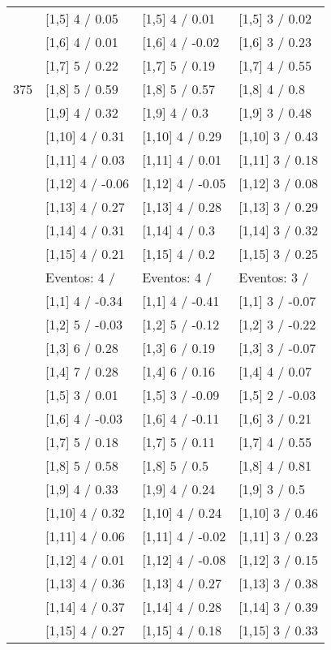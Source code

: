 \begin{table}
\begin{tabular}[t]{llll}
 & {}[1,5] 4  / 0.05 & {}[1,5] 4  / 0.01 & {}[1,5] 3  / 0.02\\
 & {}[1,6] 4  / 0.01 & {}[1,6] 4  / -0.02 & {}[1,6] 3  / 0.23\\
 & {}[1,7] 5  / 0.22 & {}[1,7] 5  / 0.19 & {}[1,7] 4  / 0.55\\
375 & {}[1,8] 5  / 0.59 & {}[1,8] 5  / 0.57 & {}[1,8] 4  / 0.8\\
\addlinespace
 & {}[1,9] 4  / 0.32 & {}[1,9] 4  / 0.3 & {}[1,9] 3  / 0.48\\
 & {}[1,10] 4  / 0.31 & {}[1,10] 4  / 0.29 & {}[1,10] 3  / 0.43\\
 & {}[1,11] 4  / 0.03 & {}[1,11] 4  / 0.01 & {}[1,11] 3  / 0.18\\
 & {}[1,12] 4  / -0.06 & {}[1,12] 4  / -0.05 & {}[1,12] 3  / 0.08\\
 & {}[1,13] 4  / 0.27 & {}[1,13] 4  / 0.28 & {}[1,13] 3  / 0.29\\
\addlinespace
 & {}[1,14] 4  / 0.31 & {}[1,14] 4  / 0.3 & {}[1,14] 3  / 0.32\\
 & {}[1,15] 4  / 0.21 & {}[1,15] 4  / 0.2 & {}[1,15] 3  / 0.25\\
 & Eventos:  4 / & Eventos:  4 / & Eventos:  3 /\\
 & {}[1,1] 4  / -0.34 & {}[1,1] 4  / -0.41 & {}[1,1] 3  / -0.07\\
 & {}[1,2] 5  / -0.03 & {}[1,2] 5  / -0.12 & {}[1,2] 3  / -0.22\\
\addlinespace
 & {}[1,3] 6  / 0.28 & {}[1,3] 6  / 0.19 & {}[1,3] 3  / -0.07\\
 & {}[1,4] 7  / 0.28 & {}[1,4] 6  / 0.16 & {}[1,4] 4  / 0.07\\
 & {}[1,5] 3  / 0.01 & {}[1,5] 3  / -0.09 & {}[1,5] 2  / -0.03\\
 & {}[1,6] 4  / -0.03 & {}[1,6] 4  / -0.11 & {}[1,6] 3  / 0.21\\
 & {}[1,7] 5  / 0.18 & {}[1,7] 5  / 0.11 & {}[1,7] 4  / 0.55\\
\addlinespace
500 & {}[1,8] 5  / 0.58 & {}[1,8] 5  / 0.5 & {}[1,8] 4  / 0.81\\
 & {}[1,9] 4  / 0.33 & {}[1,9] 4  / 0.24 & {}[1,9] 3  / 0.5\\
 & {}[1,10] 4  / 0.32 & {}[1,10] 4  / 0.24 & {}[1,10] 3  / 0.46\\
 & {}[1,11] 4  / 0.06 & {}[1,11] 4  / -0.02 & {}[1,11] 3  / 0.23\\
 & {}[1,12] 4  / 0.01 & {}[1,12] 4  / -0.08 & {}[1,12] 3  / 0.15\\
\addlinespace
 & {}[1,13] 4  / 0.36 & {}[1,13] 4  / 0.27 & {}[1,13] 3  / 0.38\\
 & {}[1,14] 4  / 0.37 & {}[1,14] 4  / 0.28 & {}[1,14] 3  / 0.39\\
 & {}[1,15] 4  / 0.27 & {}[1,15] 4  / 0.18 & {}[1,15] 3  / 0.33\\
\bottomrule
\end{tabular}
\end{table}
